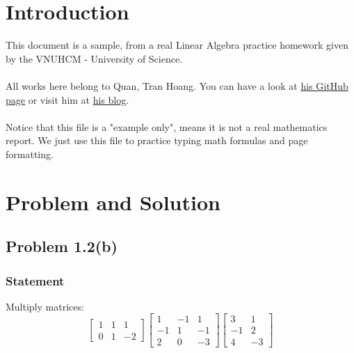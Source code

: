 \documentclass{article}
\begin{document}
    \section{Introduction}

    This document is a sample, from a real Linear Algebra practice homework given by the VNUHCM - University of Science.
    \\\\
    All works here belong to Quan, Tran Hoang. You can have a look at \href{https://github.com/trhgquan}{his GitHub page} or visit him at \href{https://www.tranhoangquan.codes}{his blog}.
    \\\\
    Notice that this file is a "example only", means it is not a real mathematics report. We just use this file to practice typing math formulas and page formatting.

    \section{Problem and Solution}
        \subsection{Problem 1.2(b)}
            \subsubsection{Statement}
                Multiply matrices:
                \begin{equation*}
                    \begin{bmatrix}1 & 1 & 1 \\ 0 & 1 & -2\end{bmatrix}
                    \begin{bmatrix}1 & -1 & 1 \\ -1 & 1 & -1 \\ 2 & 0 & -3\end{bmatrix}
                    \begin{bmatrix}3 & 1 \\ -1 & 2 \\ 4 & -3\end{bmatrix}
                \end{equation*}
\end{document}
